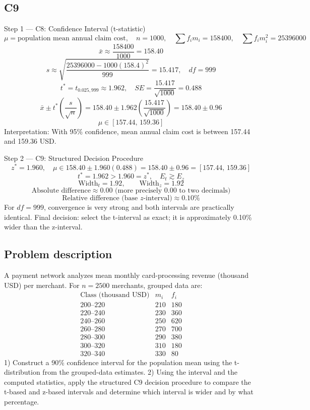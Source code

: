 \begin{ExamProblems}
		\subsection*{C9}
		Step 1 --- C8: Confidence Interval (t-statistic)
		\[
		\mu=\text{population mean annual claim cost},\quad n=1000,\quad \sum f_im_i=158400,\quad \sum f_im_i^2=25396000
		\]
		\[
		\bar{x}\approx\frac{158400}{1000}=158.40
		\]
		\[
		s\approx\sqrt{\frac{25396000-1000(158.4)^2}{999}}=15.417,\quad df=999
		\]
		\[
		t^*=t_{0.025,999}\approx 1.962,\quad SE=\frac{15.417}{\sqrt{1000}}=0.488
		\]
		\[
		\bar{x}\pm t^*\left(\frac{s}{\sqrt{n}}\right)=158.40\pm 1.962\left(\frac{15.417}{\sqrt{1000}}\right)=158.40\pm 0.96
		\]
		\[
		\mu\in[157.44,\,159.36]
		\]
		Interpretation: With 95\% confidence, mean annual claim cost is between 157.44 and 159.36 USD.

		Step 2 --- C9: Structured Decision Procedure
		\[
		z^*=1.960,\quad \mu\in 158.40\pm 1.960(0.488)=158.40\pm 0.96=[157.44,\,159.36]
		\]
		\[
		t^*=1.962>1.960=z^*,\quad E_t\gtrsim E_z
		\]
		\[
		\text{Width}_t=1.92,\qquad \text{Width}_z=1.92
		\]
		\[
		\text{Absolute difference}\approx 0.00\text{ (more precisely }0.00\text{ to two decimals)}
		\]
		\[
		\text{Relative difference (base }z\text{-interval)}\approx 0.10\%
		\]
		For $df=999$, convergence is very strong and both intervals are practically identical.
		Final decision: select the t-interval as exact; it is approximately 0.10\% wider than the z-interval.

		\newpage
		\item
		\subsection*{Problem description}
		A payment network analyzes mean monthly card-processing revenue (thousand USD) per merchant.
		For $n=2500$ merchants, grouped data are:
		\[
		\begin{array}{c|c|c}
		\text{Class (thousand USD)} & m_i & f_i\\\hline
		200\text{--}220 & 210 & 180\\
		220\text{--}240 & 230 & 360\\
		240\text{--}260 & 250 & 620\\
		260\text{--}280 & 270 & 700\\
		280\text{--}300 & 290 & 380\\
		300\text{--}320 & 310 & 180\\
		320\text{--}340 & 330 & 80
		\end{array}
		\]
		1) Construct a 90\% confidence interval for the population mean using the t-distribution from the grouped-data estimates.
		2) Using the interval and the computed statistics, apply the structured C9 decision procedure to compare the t-based and z-based intervals and determine which interval is wider and by what percentage.


\end{ExamProblems}
